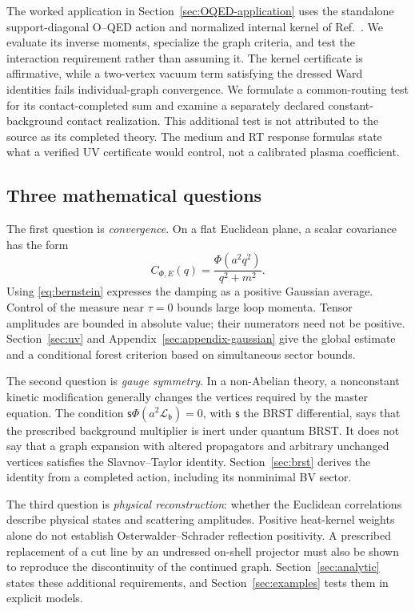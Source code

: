 \documentclass[final,5p,times,twocolumn,numbers,nopreprintline]{elsarticle}
\numberwithin{equation}{section}
\theoremstyle{definition}
\theoremstyle{remark}
\newcommand{\bb}{\mathfrak b}
\newcommand{\BR}{\mathsf s}
\newcommand{\Ph}{\Phi}
\begin{document}
The worked application in Section~\ref{sec:OQED-application} uses the
standalone support-diagonal O--QED action and normalized internal kernel
of Ref.~\cite{ChiapponeIgnition}. We evaluate its inverse moments,
specialize the graph criteria, and test the interaction requirement
rather than assuming it. The kernel certificate is affirmative, while
a two-vertex vacuum term satisfying the dressed Ward identities fails
individual-graph convergence. We formulate a common-routing test for
its contact-completed sum and examine a separately declared
constant-background contact realization. This additional test is not
attributed to the source as its completed theory. The medium and RT
response formulas state what a verified UV certificate would control,
not a calibrated plasma coefficient.

\subsection{Three mathematical questions}

The first question is \emph{convergence}. On a flat Euclidean plane, a scalar
covariance has the form
\begin{equation}
 C_{\Ph,E}(q)=\frac{\Ph(a^2q^2)}{q^2+m^2}.
 \label{eq:covariance-intro}
\end{equation}
Using \eqref{eq:bernstein} expresses the damping as a positive
Gaussian average. Control of the measure near \(\tau=0\) bounds
large loop momenta. Tensor amplitudes are bounded in absolute value;
their numerators need not be positive. Section~\ref{sec:uv} and
Appendix~\ref{sec:appendix-gaussian} give the global estimate and a
conditional forest criterion based on simultaneous sector bounds.

The second question is \emph{gauge symmetry}. In a non-Abelian theory, a
nonconstant kinetic modification generally changes the vertices required
by the master equation. The condition
\(\BR\Ph(a^2\mathscr L_{\bb})=0\), with \(\BR\) the BRST differential,
says that the prescribed background multiplier is inert under quantum
BRST. It does not say that a graph expansion with altered propagators
and arbitrary unchanged vertices satisfies the Slavnov--Taylor identity.
Section~\ref{sec:brst} derives the identity from a completed action,
including its nonminimal BV sector.

The third question is \emph{physical reconstruction}: whether the
Euclidean correlations describe physical states and scattering
amplitudes. Positive heat-kernel weights alone do not establish
Osterwalder--Schrader reflection positivity. A prescribed replacement
of a cut line by an undressed on-shell projector must also be shown
to reproduce the discontinuity of the continued graph.
Section~\ref{sec:analytic} states these additional requirements,
and Section~\ref{sec:examples} tests them in explicit models.
\end{document}
